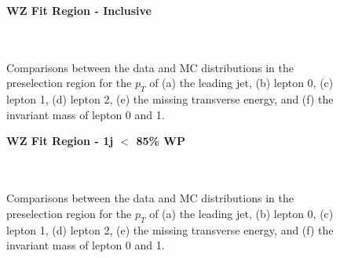 
\begin{figure}[h]
    \centering
    \textbf{WZ Fit Region - Inclusive}\\
    \\      
    \\
    \caption{Comparisons between the data and MC distributions in the preselection region for the $p_T$ of (a) the leading jet, (b) lepton 0, (c) lepton 1, (d) lepton 2, (e) the missing transverse energy, and (f) the invariant mass of lepton 0 and 1.}
    \label{kin:inclusive}
\end{figure}

\begin{figure}[h]
    \centering
    \textbf{WZ Fit Region - 1j $<$ 85\% WP}\\
    \\
    \\
    \caption{Comparisons between the data and MC distributions in the preselection region for the $p_T$ of (a) the leading jet, (b) lepton 0, (c) lepton 1, (d) lepton 2, (e) the missing transverse energy, and (f) the invariant mass of lepton 0 and 1.}
    \label{kin:WP_1j_not85}
\end{figure}

